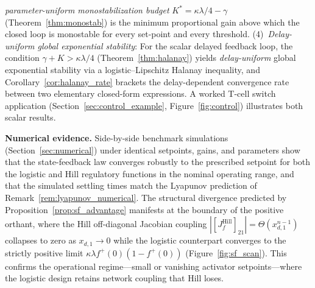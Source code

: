 \documentclass[12pt]{article}
\begin{document}
\emph{parameter-uniform monostabilization budget}
$K^{*}=\kappa\lambda/4-\gamma$ (Theorem~\ref{thm:monostab}) is the
minimum proportional gain above which the closed loop is monostable for
every set-point and every threshold.
(4)~\emph{Delay-uniform global exponential stability}: For the scalar
delayed feedback loop, the condition $\gamma+K>\kappa\lambda/4$
(Theorem~\ref{thm:halanay}) yields \emph{delay-uniform} global
exponential stability via a logistic--Lipschitz Halanay inequality, and
Corollary~\ref{cor:halanay_rate} brackets the delay-dependent
convergence rate between two elementary closed-form expressions. A
worked T-cell switch application (Section~\ref{sec:control_example},
Figure~\ref{fig:control}) illustrates both scalar results.

\medskip
\noindent\textbf{Numerical evidence.} Side-by-side benchmark simulations
(Section~\ref{sec:numerical}) under identical setpoints, gains, and parameters
show that the state-feedback law converges robustly to the prescribed
setpoint for both the logistic and Hill regulatory functions in the nominal
operating range, and that the simulated settling times match the Lyapunov
prediction of Remark~\ref{rem:lyapunov_numerical}. The structural divergence
predicted by Proposition~\ref{prop:sf_advantage} manifests at the boundary
of the positive orthant, where the Hill off-diagonal Jacobian coupling
$|[J_f^{\mathrm{Hill}}]_{21}|=\Theta(x_{d,1}^{n-1})$ collapses to zero as
$x_{d,1}\to 0$ while the logistic counterpart converges to the strictly
positive limit $\kappa\lambda f^+(0)(1-f^+(0))$ (Figure~\ref{fig:sf_scan}).
This confirms the operational regime---small or vanishing activator
setpoints---where the logistic design retains network coupling that Hill
loses.
\end{document}
